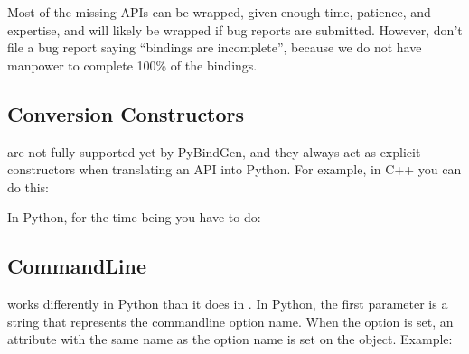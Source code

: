\documentclass[letterpaper,10pt,english]{sphinxmanual}
\renewcommand{\sphinxcode}[1]{\texttt{\small{#1}}}
\begin{document}
Most of the missing APIs can be wrapped, given enough time, patience, and expertise, and will likely be wrapped if bug reports are submitted.  However, don’t file a bug report saying “bindings are incomplete”, because we do not have manpower to complete 100\% of the bindings.


\subsection{Conversion Constructors}
\label{\detokenize{python:conversion-constructors}}
 are not fully supported yet by PyBindGen, and they always act as explicit constructors when translating an API into Python.  For example, in C++ you can do this:

\begin{sphinxVerbatim}[commandchars=\\\{\}]
 
  
 
\end{sphinxVerbatim}

In Python, for the time being you have to do:

\begin{sphinxVerbatim}[commandchars=\\\{\}]
  
 
\end{sphinxVerbatim}


\subsection{CommandLine}
\label{\detokenize{python:commandline}}
\sphinxcode{} works differently in Python than it does in .  In Python, the first parameter is a string that represents the command\sphinxhyphen{}line option name.  When the option is set, an attribute with the same name as the option name is set on the \sphinxcode{} object.  Example:
\end{document}
